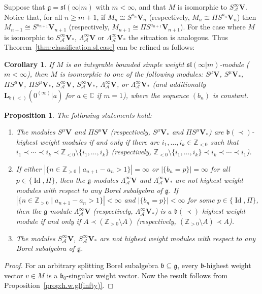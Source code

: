 \documentclass[12pt]{amsart}
\newcommand\C{\mathbb{C}}
\newcommand\Z{\mathbb{Z}}
\newcommand\g{\mathfrak{g}}
\newcommand\fb{\mathfrak{b}}
\newcommand\fsl{\mathfrak{sl}}
\newcommand\cA{\mathcal{A}}
\newcommand\bV{\mathbf{V}}
\newcommand\bL{\mathbf{L}}
\DeclareMathOperator{\Id}{Id}
\theoremstyle{plain}
\newtheorem{prop}[theo]{Proposition}
\newtheorem{cor}[theo]{Corollary}
\theoremstyle{definition}
\numberwithin{equation}{section}
\begin{document}
Suppose that $\g=\fsl(\infty|m)$ with $m<\infty$, and that $M$ is isomorphic to $S_\cA^\infty \bV$. Notice that, for all $n\geq m+1$, if $M_n\cong S^{a_n} \bV_n$ (respectively, $M_n\cong \Pi S^{a_n} \bV_n$) then $M_{n+1}\cong S^{a_{n+1}} \bV_{n+1}$ (respectively, $M_{n+1}\cong \Pi S^{a_{n+1}} \bV_{n+1}$). For the case where $M$ is isomorphic to $S_\cA^\infty \bV_*$, $\Lambda_\cA^{\infty} \bV$ or $\Lambda_\cA^{\infty} \bV_*$ the situation is analogous. Thus Theorem~\ref{thm:classification.sl.case} can be refined as follows:

\begin{cor}\label{cor:classification.sl.case}
If $M$ is an integrable bounded simple weight $\fsl(\infty | m)$-module ($m<\infty$), then $M$ is isomorphic to one of the following modules: $S^\mu \bV$, $S^\mu \bV_*$, $\Pi S^\mu \bV$, $\Pi S^\mu \bV_*$, $S_\cA^\infty \bV$, $S_\cA^\infty \bV_*$, $\Lambda_\cA^{\infty} \bV$, or $\Lambda_\cA^{\infty} \bV_*$ (and additionally $\bL_{\fb(<)}(0^{(\infty)}|a)$ for $a\in \C$ if $m=1$), where the sequence $(b_n)$ is constant.
\end{cor}

\begin{prop}\label{prop:M.h.w}
The following statements hold:
\begin{enumerate}
\item The modules $S^\mu \bV$ and $\Pi S^\mu \bV$ (respectively, $S^\mu \bV_*$ and $\Pi S^\mu \bV_*$) are $\fb(\prec)$-highest weight modules if and only if there are $i_1,\ldots, i_k\in \Z_{<0}$ such that $i_1\prec \cdots \prec i_k\prec \Z_{<0} \setminus \{i_1,\ldots, i_k\}$ (respectively, $\Z_{<0} \setminus \{i_1,\ldots, i_k\}\prec i_k\prec \cdots \prec i_1$).
\item If either $|\{n\in \Z_{>0}\mid a_{n+1} - a_n>1\}|=\infty$ or $|\{b_n=p\}|=\infty$ for all $p\in \{\Id, \Pi\}$, then the $\g$-modules $\Lambda^{\infty}_\cA \bV$ and $\Lambda^{\infty}_\cA \bV_*$ are not highest weight modules with respect to any Borel subalgebra of $\g$. If $|\{n\in \Z_{>0}\mid a_{n+1} - a_n>1\}|<\infty$ and $|\{b_n=p\}|<\infty$ for some $p\in \{\Id, \Pi\}$, then the $\g$-module $\Lambda^{\infty}_\cA \bV$ (respectively, $\Lambda^{\infty}_\cA \bV_*$) is a $\fb(\prec)$-highest weight module if and only if $A\prec (\Z_{>0}\setminus A)$ (respectively, $(\Z_{>0}\setminus A)\prec A$).
\item The modules $S^\infty_\cA \bV$, $S^\infty_\cA \bV_*$ are not highest weight modules with respect to any Borel subalgebra of $\g$.
\end{enumerate}
\end{prop}
\begin{proof}
For an arbitrary splitting Borel subalgebra $\fb\subseteq \g$, every $\fb$-highest weight vector $v\in M$ is a $\fb_0$-singular weight vector. Now the result follows from Proposition~\ref{prop:h.w.gl(infty)}.
\end{proof}
\end{document}
